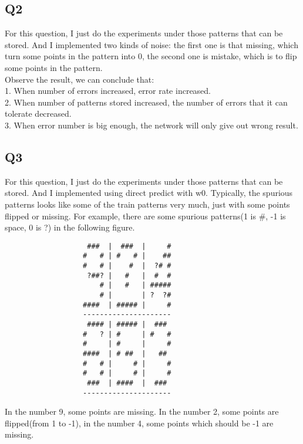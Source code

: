 \documentclass{article}
\begin{document}
  \subsection{Q2}
  For this question, I just do the experiments under those patterns that can be
  stored. And I implemented two kinds of noise: the first one is that missing,
  which turn some points in the pattern into 0, the second one is mistake, which
  is to flip some points in the pattern.\\
  Observe the result, we can conclude that:\\
  1. When number of errors increased, error rate increased.\\
  2. When number of patterns stored increased, the number of errors that it can
  tolerate decreased.\\
  3. When error number is big enough, the network will only give out wrong
  result.\\

  \subsection{Q3}
  For this question, I just do the experiments under those patterns that can be
  stored. And I implemented using direct predict with w0. Typically, the
  spurious patterns looks like some of the train patterns very much, just with
  some points flipped or missing. For example, there are some spurious
  patterns(1 is \#, -1 is space, 0 is ?) in the following figure.\\
  \begin{figure}
  \begin{verbatim}
              ###  |  ###  |     #
             #   # | #   # |    ## 
             #   # |    #  |  ?# #
              ?##? |   #   |  #  #
                 # |   #   | #####
                 # |       | ?  ?# 
             ####  | ##### |     # 
             ---------------------
              #### | ##### |  ###
             #   ? | #     | #   #
             #     | #     |     #
             ####  | # ##  |   ##
             #   # |     # |     #
             #   # |     # |     #
              ###  | ####  |  ###
             ---------------------
  \end{verbatim}
  \end{figure}
  In the number 9, some points are missing. In the number 2, some points are
  flipped(from 1 to -1), in the number 4, some points which should be -1 are missing.\\
\end{document}
